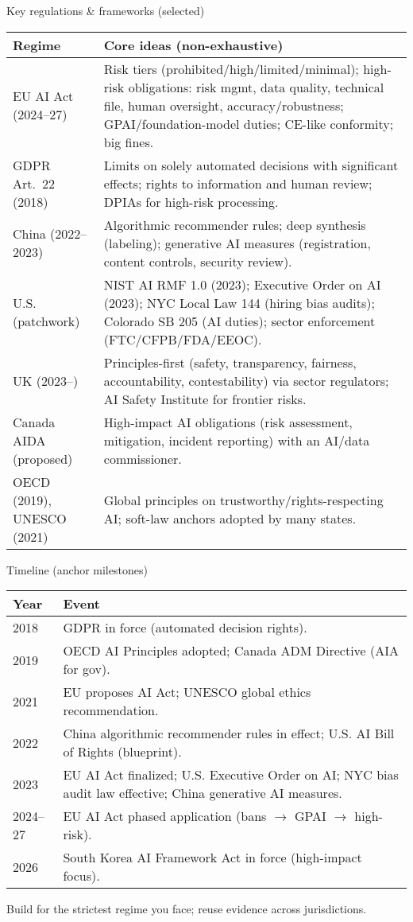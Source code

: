 \documentclass[11pt,aspectratio=169]{beamer}
\newcommand{\tinyref}[1]{\textcolor{black!60}{\scriptsize#1}}
\begin{document}
\begin{frame}{Key regulations \& frameworks (selected)}
\small
\begin{tabular}{p{3.2cm}p{10.2cm}}
\toprule
\textbf{Regime} & \textbf{Core ideas (non-exhaustive)}\\
\midrule
EU AI Act (2024–27) & Risk tiers (prohibited/high/limited/minimal); high-risk obligations: risk mgmt, data quality, technical file, human oversight, accuracy/robustness; GPAI/foundation-model duties; CE-like conformity; big fines.\\
GDPR Art.\ 22 (2018) & Limits on solely automated decisions with significant effects; rights to information and human review; DPIAs for high-risk processing.\\
China (2022–2023) & Algorithmic recommender rules; deep synthesis (labeling); generative AI measures (registration, content controls, security review).\\
U.S. (patchwork) & NIST AI RMF 1.0 (2023); Executive Order on AI (2023); NYC Local Law 144 (hiring bias audits); Colorado SB 205 (AI duties); sector enforcement (FTC/CFPB/FDA/EEOC).\\
UK (2023–) & Principles-first (safety, transparency, fairness, accountability, contestability) via sector regulators; AI Safety Institute for frontier risks.\\
Canada AIDA (proposed) & High-impact AI obligations (risk assessment, mitigation, incident reporting) with an AI/data commissioner.\\
OECD (2019), UNESCO (2021) & Global principles on trustworthy/rights-respecting AI; soft-law anchors adopted by many states.\\
\bottomrule
\end{tabular}
\end{frame}

\begin{frame}{Timeline (anchor milestones)}
\small
\begin{tabular}{p{2.8cm}p{10.8cm}}
\toprule
\textbf{Year} & \textbf{Event}\\
\midrule
2018 & GDPR in force (automated decision rights).\\
2019 & OECD AI Principles adopted; Canada ADM Directive (AIA for gov).\\
2021 & EU proposes AI Act; UNESCO global ethics recommendation.\\
2022 & China algorithmic recommender rules in effect; U.S. AI Bill of Rights (blueprint).\\
2023 & EU AI Act finalized; U.S. Executive Order on AI; NYC bias audit law effective; China generative AI measures.\\
2024--27 & EU AI Act phased application (bans $\rightarrow$ GPAI $\rightarrow$ high-risk).\\
2026 & South Korea AI Framework Act in force (high-impact focus).\\
\bottomrule
\end{tabular}
\tinyref{Build for the strictest regime you face; reuse evidence across jurisdictions.}
\end{frame}
\end{document}
